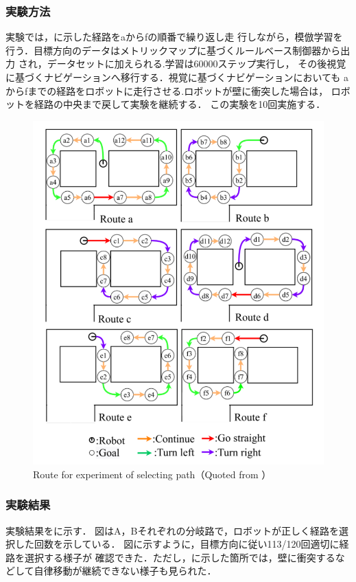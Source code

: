 \subsubsection{実験方法}
実験では，に示した経路をaからfの順番で繰り返し走
行しながら，模倣学習を行う．目標方向のデータはメトリックマップに基づくルールベース制御器から出力
され，データセットに加えられる.学習は60000ステップ実行し，
その後視覚に基づくナビゲーションへ移行する．視覚に基づくナビゲーションにおいても
aからfまでの経路をロボットに走行させる.ロボットが壁に衝突した場合は，
ロボットを経路の中央まで戻して実験を継続する．
この実験を10回実施する．

\begin{figure}[htbp]
    \centering
     \includegraphics[width=130mm]{images/pdf/haru_mech_route.pdf}
     \caption[Route for experiment of selecting path]{Route for experiment of selecting path（Quoted from \cite{haruyama2022}）}
     \label{fig:haru_mech_route}
\end{figure}
\clearpage
\subsubsection{実験結果}
実験結果をに示す．
図はA，Bそれぞれの分岐路で，ロボットが正しく経路を選択した回数を示している．
図に示すように，目標方向に従い113/120回適切に経路を選択する様子が
確認できた．ただし，に示した箇所では，壁に衝突するな
どして自律移動が継続できない様子も見られた．

